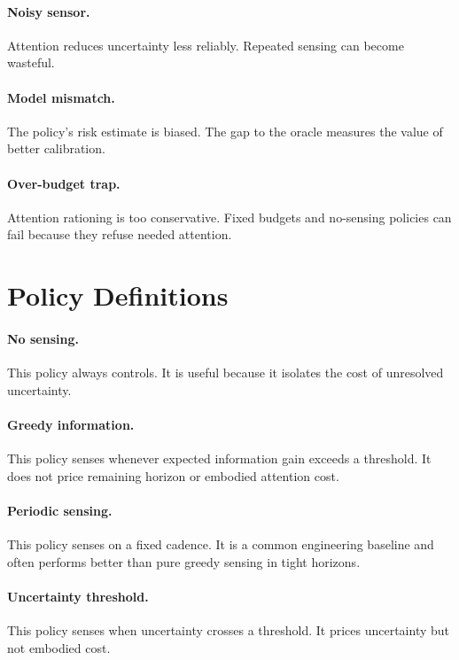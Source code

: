 \documentclass{article}
\begin{document}
\paragraph{Noisy sensor.}
Attention reduces uncertainty less reliably. Repeated sensing can become
wasteful.

\paragraph{Model mismatch.}
The policy's risk estimate is biased. The gap to the oracle measures the value
of better calibration.

\paragraph{Over-budget trap.}
Attention rationing is too conservative. Fixed budgets and no-sensing policies
can fail because they refuse needed attention.

\section{Policy Definitions}

\paragraph{No sensing.}
This policy always controls. It is useful because it isolates the cost of
unresolved uncertainty.

\paragraph{Greedy information.}
This policy senses whenever expected information gain exceeds a threshold. It
does not price remaining horizon or embodied attention cost.

\paragraph{Periodic sensing.}
This policy senses on a fixed cadence. It is a common engineering baseline and
often performs better than pure greedy sensing in tight horizons.

\paragraph{Uncertainty threshold.}
This policy senses when uncertainty crosses a threshold. It prices uncertainty
but not embodied cost.
\end{document}
